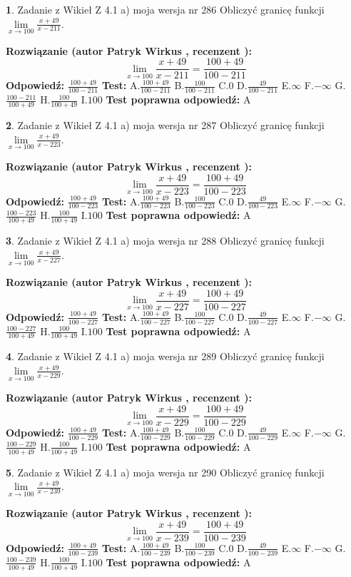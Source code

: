 \documentclass[12pt, a4paper]{article}
\theoremstyle{definition} %
\newtheorem{zad}{}
\newcommand{\zadStart}[1]{\begin{zad}#1\newline}
\newcommand{\zadStop}{\end{zad}}
\newcommand{\rozwStart}[2]{\noindent \textbf{Rozwiązanie (autor #1 , recenzent #2): }\newline}
\newcommand{\rozwStop}{\newline}
\newcommand{\odpStart}{\noindent \textbf{Odpowiedź:}\newline}
\newcommand{\odpStop}{\newline}
\newcommand{\testStart}{\noindent \textbf{Test:}\newline}
\newcommand{\testStop}{\newline}
\newcommand{\kluczStart}{\noindent \textbf{Test poprawna odpowiedź:}\newline}
\newcommand{\kluczStop}{\newline}
\begin{document}
\zadStart{Zadanie z Wikieł Z 4.1 a) moja wersja nr 286}
Obliczyć granicę funkcji $\lim\limits_{x\to100}\frac{x+49}{x-211}$.
\zadStop
\rozwStart{Patryk Wirkus}{}
$$\lim\limits_{x\to100}\frac{x+49}{x-211} = \frac{100+49}{100-211}$$
\rozwStop
\odpStart
$\frac{100+49}{100-211}$
\odpStop
\testStart
A.$\frac{100+49}{100-211}$
B.$\frac{100}{100-211}$
C.$0$
D.$\frac{49}{100-211}$
E.$\infty$
F.$-\infty$
G.$\frac{100-211}{100+49}$
H.$\frac{100}{100+49}$
I.$100$
\testStop
\kluczStart
A
\kluczStop



\zadStart{Zadanie z Wikieł Z 4.1 a) moja wersja nr 287}
Obliczyć granicę funkcji $\lim\limits_{x\to100}\frac{x+49}{x-223}$.
\zadStop
\rozwStart{Patryk Wirkus}{}
$$\lim\limits_{x\to100}\frac{x+49}{x-223} = \frac{100+49}{100-223}$$
\rozwStop
\odpStart
$\frac{100+49}{100-223}$
\odpStop
\testStart
A.$\frac{100+49}{100-223}$
B.$\frac{100}{100-223}$
C.$0$
D.$\frac{49}{100-223}$
E.$\infty$
F.$-\infty$
G.$\frac{100-223}{100+49}$
H.$\frac{100}{100+49}$
I.$100$
\testStop
\kluczStart
A
\kluczStop



\zadStart{Zadanie z Wikieł Z 4.1 a) moja wersja nr 288}
Obliczyć granicę funkcji $\lim\limits_{x\to100}\frac{x+49}{x-227}$.
\zadStop
\rozwStart{Patryk Wirkus}{}
$$\lim\limits_{x\to100}\frac{x+49}{x-227} = \frac{100+49}{100-227}$$
\rozwStop
\odpStart
$\frac{100+49}{100-227}$
\odpStop
\testStart
A.$\frac{100+49}{100-227}$
B.$\frac{100}{100-227}$
C.$0$
D.$\frac{49}{100-227}$
E.$\infty$
F.$-\infty$
G.$\frac{100-227}{100+49}$
H.$\frac{100}{100+49}$
I.$100$
\testStop
\kluczStart
A
\kluczStop



\zadStart{Zadanie z Wikieł Z 4.1 a) moja wersja nr 289}
Obliczyć granicę funkcji $\lim\limits_{x\to100}\frac{x+49}{x-229}$.
\zadStop
\rozwStart{Patryk Wirkus}{}
$$\lim\limits_{x\to100}\frac{x+49}{x-229} = \frac{100+49}{100-229}$$
\rozwStop
\odpStart
$\frac{100+49}{100-229}$
\odpStop
\testStart
A.$\frac{100+49}{100-229}$
B.$\frac{100}{100-229}$
C.$0$
D.$\frac{49}{100-229}$
E.$\infty$
F.$-\infty$
G.$\frac{100-229}{100+49}$
H.$\frac{100}{100+49}$
I.$100$
\testStop
\kluczStart
A
\kluczStop



\zadStart{Zadanie z Wikieł Z 4.1 a) moja wersja nr 290}
Obliczyć granicę funkcji $\lim\limits_{x\to100}\frac{x+49}{x-239}$.
\zadStop
\rozwStart{Patryk Wirkus}{}
$$\lim\limits_{x\to100}\frac{x+49}{x-239} = \frac{100+49}{100-239}$$
\rozwStop
\odpStart
$\frac{100+49}{100-239}$
\odpStop
\testStart
A.$\frac{100+49}{100-239}$
B.$\frac{100}{100-239}$
C.$0$
D.$\frac{49}{100-239}$
E.$\infty$
F.$-\infty$
G.$\frac{100-239}{100+49}$
H.$\frac{100}{100+49}$
I.$100$
\testStop
\kluczStart
A
\kluczStop
\end{document}
